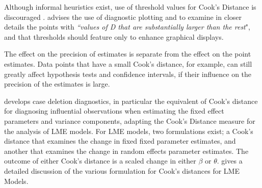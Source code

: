 \documentclass[12pt, a4paper]{report}
\theoremstyle{definition}
\theoremstyle{remark}
\begin{document}

Although informal heuristics exist, use of threshold values for Cook's Distance is discouraged \citep{fox1991}. \citet{fox1991} advises the use of diagnostic plotting and to examine in closer details the points with \textit{``values of D that are substantially larger than the rest}", and that thresholds should feature only to enhance graphical displays.

The effect on the precision of estimates is separate from the effect on the point estimates. Data points that have a small Cook's distance, for example, can still greatly affect hypothesis tests and confidence intervals, if their  influence on the precision of the estimates is large.

\citet{Christensen} develops  case deletion diagnostics, in particular the equivalent of  Cook's distance for diagnosing influential observations when estimating the fixed effect parameters and variance components, adapting the Cook's Distance measure for the analysis of LME models. For LME models, two formulations exist; a Cook's distance that examines the change in fixed fixed parameter estimates, and another that examines the change in random effects parameter estimates. The outcome of either Cook's distance is a scaled change in either $\beta$ or $\theta$. \citet{Zewotir} gives a detailed discussion of the various formulation for Cook's distances for LME Models.


%


\end{document}
